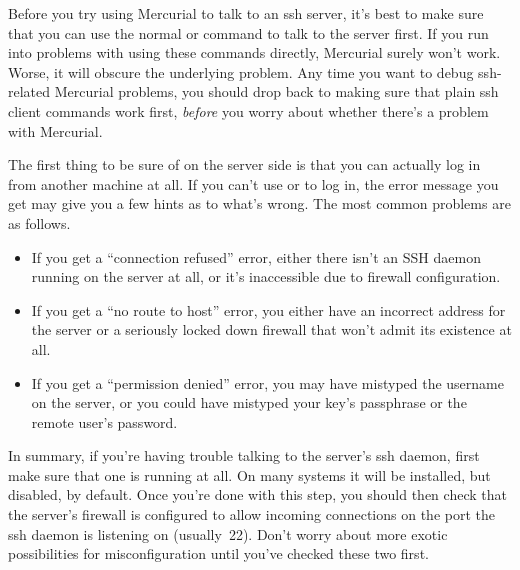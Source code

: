 Before you try using Mercurial to talk to an ssh server, it's best to
make sure that you can use the normal  or 
command to talk to the server first.  If you run into problems with
using these commands directly, Mercurial surely won't work.  Worse, it
will obscure the underlying problem.  Any time you want to debug
ssh-related Mercurial problems, you should drop back to making sure
that plain ssh client commands work first, \emph{before} you worry
about whether there's a problem with Mercurial.

The first thing to be sure of on the server side is that you can
actually log in from another machine at all.  If you can't use
 or  to log in, the error message you get
may give you a few hints as to what's wrong.  The most common problems
are as follows.
\begin{itemize}
\item If you get a ``connection refused'' error, either there isn't an
  SSH daemon running on the server at all, or it's inaccessible due to
  firewall configuration.
\item If you get a ``no route to host'' error, you either have an
  incorrect address for the server or a seriously locked down firewall
  that won't admit its existence at all.
\item If you get a ``permission denied'' error, you may have mistyped
  the username on the server, or you could have mistyped your key's
  passphrase or the remote user's password.
\end{itemize}
In summary, if you're having trouble talking to the server's ssh
daemon, first make sure that one is running at all.  On many systems
it will be installed, but disabled, by default.  Once you're done with
this step, you should then check that the server's firewall is
configured to allow incoming connections on the port the ssh daemon is
listening on (usually~22).  Don't worry about more exotic
possibilities for misconfiguration until you've checked these two
first.

